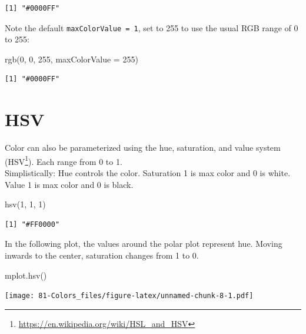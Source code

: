 \documentclass[
]{book}
\newenvironment{Shaded}{\begin{snugshade}}{\end{snugshade}}
\newcommand{\AttributeTok}[1]{\textcolor[rgb]{0.77,0.63,0.00}{#1}}
\newcommand{\DecValTok}[1]{\textcolor[rgb]{0.00,0.00,0.81}{#1}}
\newcommand{\FunctionTok}[1]{\textcolor[rgb]{0.00,0.00,0.00}{#1}}
\newcommand{\NormalTok}[1]{#1}
\DeclareRobustCommand{\href}[2]{#2\footnote{\url{#1}}}
\renewcommand{\href}[2]{#2\footnote{\url{#1}}}
\begin{document}
\begin{verbatim}
[1] "#0000FF"
\end{verbatim}

Note the default \texttt{maxColorValue\ =\ 1}, set to 255 to use the usual RGB range of 0 to 255:

\begin{Shaded}
\begin{Highlighting}[]
\FunctionTok{rgb}\NormalTok{(}\DecValTok{0}\NormalTok{, }\DecValTok{0}\NormalTok{, }\DecValTok{255}\NormalTok{, }\AttributeTok{maxColorValue =} \DecValTok{255}\NormalTok{)}
\end{Highlighting}
\end{Shaded}

\begin{verbatim}
[1] "#0000FF"
\end{verbatim}

\hypertarget{hsv}{%
\section{HSV}\label{hsv}}

Color can also be parameterized using the hue, saturation, and value system (\href{https://en.wikipedia.org/wiki/HSL_and_HSV}{HSV}). Each range from 0 to 1.\\
Simplistically: Hue controls the color. Saturation 1 is max color and 0 is white. Value 1 is max color and 0 is black.

\begin{Shaded}
\begin{Highlighting}[]
\FunctionTok{hsv}\NormalTok{(}\DecValTok{1}\NormalTok{, }\DecValTok{1}\NormalTok{, }\DecValTok{1}\NormalTok{)}
\end{Highlighting}
\end{Shaded}

\begin{verbatim}
[1] "#FF0000"
\end{verbatim}

In the following plot, the values around the polar plot represent hue. Moving inwards to the center, saturation changes from 1 to 0.

\begin{Shaded}
\begin{Highlighting}[]
\FunctionTok{mplot.hsv}\NormalTok{()}
\end{Highlighting}
\end{Shaded}

\texttt{[image: 81-Colors\_files/figure-latex/unnamed-chunk-8-1.pdf]}
\end{document}
